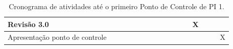 \begin{table}[H]
\begin{tabular}{|p{2.5cm}|p{0.5cm}|p{0.5cm}|p{0.5cm}|p{0.5cm}|p{0.5cm}|p{0.5cm}|p{0.5cm}|p{0.5cm}|p{0.5cm}|p{0.5cm}|p{0.5cm}|p{0.5cm}|p{0.5cm}|p{0.5cm}|p{0.5cm}|}
Revisão 3.0                    &                           &                           &                           &                           &                           &                           &                           &                           &                           &                           &                           & \cellcolor[HTML]{3166FF}X &       &       &                           \\ \hline
Apresentação ponto de controle &                           &                           &                           &                           &                           &                           &                           &                           &                           &                           &                           &                           &       &       & \cellcolor[HTML]{3166FF}X \\ \hline
\end{tabular}
\caption{Cronograma de atividades até o primeiro Ponto de Controle de PI 1.}
\label{tab:cronograma1}
\end{table}

